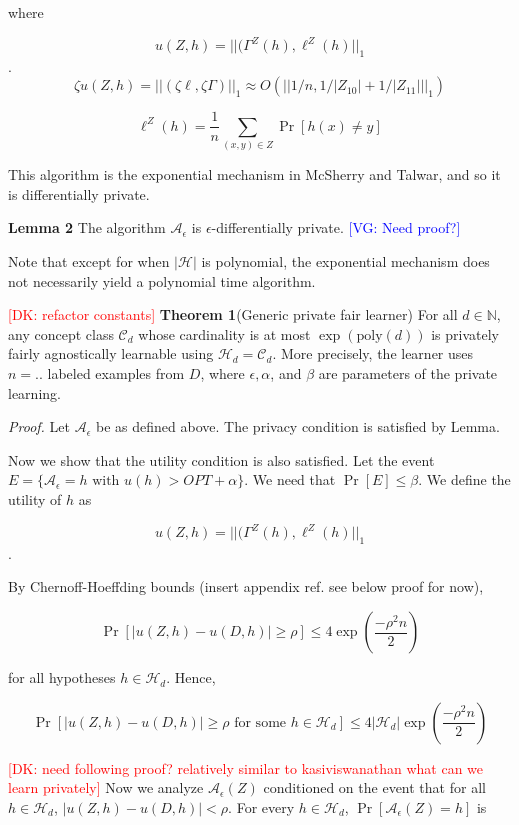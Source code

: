 \documentclass[format = sigconf]{acmart}
\newcommand{\dk}[1]{\textcolor{red}{[DK: #1]}}
\newcommand{\vg}[1]{\textcolor{blue}{[VG: #1]}}
\newcommand{\A}{\mathcal{A}}
\renewcommand{\H}{\mathcal{H}}
\newcommand{\C}{\mathcal{C}}
\newcommand{\1}{\mathbbm{1}}
\newcommand{\eps}{\epsilon}
\newcommand{\zt}{\zeta}
\newcommand{\z}[1]{Z_{#1}}
\theoremstyle{definition}
\begin{document}
where

$$u(Z,h) = ||(\Gamma^Z(h), \ell^Z(h)||_{1}$$.
$$\zt u(Z,h) = ||(\zt\ell,\zt{\Gamma})||_1 \approx O(||1/n,1/|\z{10}|+1/|Z_{11}|||_1)$$

$$\ell^Z(h) = \frac{1}{n} \sum_{(x,y) \in Z}\Pr[h(x) \neq y]$$



This algorithm is the exponential mechanism in McSherry and Talwar, and so it is differentially private.

{\bf Lemma 2} The algorithm $\A_\eps$ is $\eps$-differentially private.
\vg{Need proof?}

Note that except for when $|\H|$ is polynomial, the exponential mechanism does not necessarily yield a polynomial time algorithm.

\dk{refactor constants}
{\bf Theorem 1}(Generic private fair learner) For all $d \in \mathbb{N}$, any concept class $\mathcal{C}_d$ whose cardinality is at most $\exp(\text{poly}(d))$ is privately fairly agnostically learnable using $\H_d = \C_d$. More precisely, the learner uses $n = ..$ labeled examples from $D$, where $\eps, \alpha$, and $\beta$ are parameters of the private learning.

{\it Proof.} Let $\A_{\eps}$ be as defined above. The privacy condition is satisfied by Lemma.

Now we show that the utility condition is also satisfied. Let the event $E = \{\A_{\eps} = h \text{ with } u(h) > OPT + \alpha\}$. We need that $\Pr[E] \leq \beta$. We define the utility of $h$ as

$$u(Z,h) = ||(\Gamma^Z(h), \ell^Z(h)||_{1}$$.

By Chernoff-Hoeffding bounds (insert appendix ref. see below proof for now),



$$\Pr[|u(Z,h) - u(D,h)| \geq \rho] \leq 4\exp(\frac{-\rho^2n}{2})$$

for all hypotheses $h \in \H_d$. Hence,

$$\Pr[|u(Z,h) - u(D,h)| \geq \rho \text{ for some } h \in \H_d] \leq 4|\H_d|\exp(\frac{-\rho^2n}{2})$$

\dk{need following proof? relatively similar to kasiviswanathan what can we learn privately}
Now we analyze $\A_\eps(Z)$ conditioned on the event that for all $h\in \H_d$, $|u(Z,h) - u(D,h)| < \rho$. For every $h \in \H_d$, $\Pr[\A_\eps(Z) = h]$ is
\end{document}
